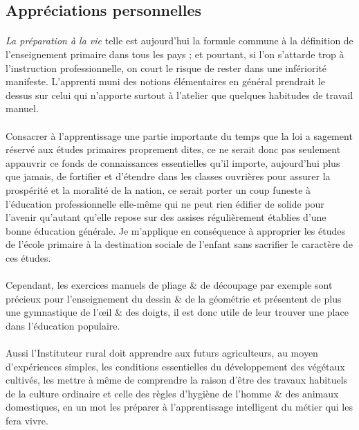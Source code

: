 \documentclass[../eBook.tex]{subfiles}
\begin{document}
  \subsection*{Appréciations personnelles}
    \paragraph{}\og \textit{La préparation à la vie} \fg{} telle est aujourd'hui la formule commune à la définition de l'enseignement primaire dans tous les pays ; et pourtant, si l'on s'attarde trop à l'instruction professionnelle, on court le risque de rester dans une infériorité manifeste. L'apprenti muni des notions élémentaires en général prendrait le dessus sur celui qui n'apporte surtout à l'atelier que quelques habitudes de travail manuel.
    \paragraph{}Consacrer à l'apprentissage une partie importante du temps que la loi a sagement réservé aux études primaires proprement dites, ce ne serait donc pas seulement appauvrir ce fonds de connaissances essentielles qu'il importe, aujourd'hui plus que jamais, de fortifier et d'étendre dans les classes ouvrières pour assurer la prospérité et la moralité de la nation, ce serait porter un coup funeste à l'éducation professionnelle elle-même qui ne peut rien édifier de solide pour l'avenir qu'autant qu'elle repose sur des assises régulièrement établies d'une bonne éducation générale. Je m'applique en conséquence à approprier les études de l'école primaire à la destination sociale de l'enfant sans sacrifier le caractère de ces études.
    \paragraph{}Cependant, les exercices manuels de pliage \& de découpage par exemple sont précieux pour l'enseignement du dessin \& de la géométrie et présentent de plus une gymnastique de l'\oe il \& des doigts, il est donc utile de leur trouver une place dans l'éducation populaire.
    \paragraph{}Aussi l'Instituteur rural doit apprendre aux futurs agriculteurs, au moyen d'expériences simples, les conditions essentielles du développement des végétaux cultivés, les mettre à même de comprendre la raison d'être des travaux habituels de la culture ordinaire et celle des règles d'hygiène de l'homme \& des animaux domestiques, en un mot les préparer à l'apprentissage intelligent du métier qui les fera vivre.
\end{document}
